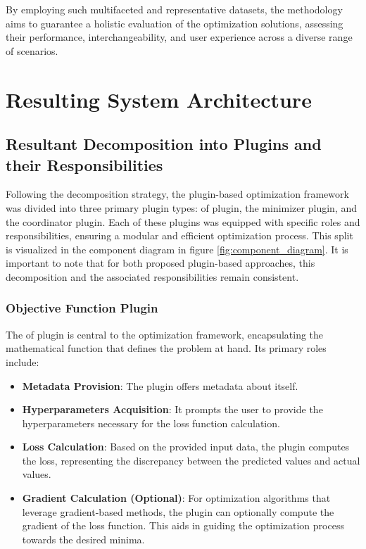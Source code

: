 \documentclass[
  a4paper,  %
  twoside,  %
  bibliography=totoc,
  headsepline,
  cleardoublepage=empty,
  parskip=half,
  draft=false
]{scrbook}
\begin{document}
By employing such multifaceted and representative datasets, the methodology aims to guarantee a holistic evaluation of the optimization solutions, assessing their performance, interchangeability, and user experience across a diverse range of scenarios.

\chapter{Resulting System Architecture}
\label{chap:architecture}


\section{Resultant Decomposition into Plugins and their Responsibilities}

Following the decomposition strategy, the plugin-based optimization framework was divided into three primary plugin types:
\gls{of} plugin, the minimizer plugin, and the coordinator plugin.
Each of these plugins was equipped with specific roles and responsibilities, ensuring a modular and efficient optimization process.
This split is visualized in the component diagram in figure \ref{fig:component_diagram}.
It is important to note that for both proposed plugin-based approaches, this decomposition and the associated responsibilities remain consistent.

\subsection{Objective Function Plugin}

The \gls{of} plugin is central to the optimization framework, encapsulating the mathematical function that defines the problem at hand.
Its primary roles include:

\begin{itemize}
\item \textbf{Metadata Provision}: The plugin offers metadata about itself.
\item \textbf{Hyperparameters Acquisition}: It prompts the user to provide the hyperparameters necessary for the loss function calculation.
\item \textbf{Loss Calculation}: Based on the provided input data, the plugin computes the loss, representing the discrepancy between the predicted values and actual values.
\item \textbf{Gradient Calculation (Optional)}: For optimization algorithms that leverage gradient-based methods, the plugin can optionally compute the gradient of the loss function. This aids in guiding the optimization process towards the desired minima.
\end{itemize}
\end{document}
